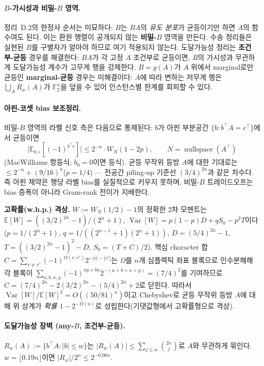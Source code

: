 \documentclass[11pt,a4paper]{article}
\theoremstyle{plain}
\theoremstyle{definition}
\newcommand{\F}{\mathbb{F}}
\newcommand{\E}{\mathbb{E}}
\begin{document}
\paragraph{$B$-가시성과 비밀-$B$ 영역.} 정리~D.2의 한정사 순서는 미묘하다: $B$는 $BA$의 \emph{유도 분포}가 균등이기만 하면 $A$의 함수여도 된다. 이는 환원 행렬이 공개되지 않는 \textbf{비밀-$B$} 영역을 만든다. 수송 정리들은 실현된 $B$를 구별자가 알아야 하므로 여기 적용되지 않는다. 도달가능성 정리는 \textbf{조건부-균등} 경우를 해결한다: $BA$가 각 고정 $A$ 조건부로 균등이면, $B$의 가시성과 무관하게 도달가능성 계수가 고무게 행을 강제한다. $B=g(A)$가 $A$ 위에서 marginal로만 균등인 \textbf{marginal-균등} 경우는 미해결이다: $A$에 따라 변하는 저무게 행은 $\bigcup_A R_w(A)$가 $\F_2^n$을 덮을 수 있어 인스턴스별 한계를 회피할 수 있다.

\paragraph{아핀-코셋 bias 보조정리.} 비밀-$B$ 영역의 라벨 신호 측은 다음으로 통제된다: $b$가 아핀 부분공간 $\{b : b^{\!\top}A = c^{\!\top}\}$에서 균등이면
\[
\bigl|\E_{b,e}[(-1)^{b^{\!\top}e}]\bigr| \le 2^{-n}\cdot W_N(1-2p), \qquad N = \operatorname{nullspace}(A^{\!\top})
\]
(MacWilliams 항등식; $b_0 = 0$이면 등식). 균등 무작위 등방 $A$에 대한 기대로는 $\le 2^{-n} + (9/16)^n$($p=1/4$) --- 전공간 piling-up 기준선 $(3/4)^{2n}$과 같은 차수다. 즉 아핀 제약은 행당 라벨 bias를 실질적으로 키우지 못하며, 비밀-$B$ 트레이드오프는 bias 증폭이 아니라 Gram-rank 전이가 지배한다.

\textbf{고확률(w.h.p.) 격상.} $W := W_N(1/2)-1$의 정확한 2차 모멘트는 $\E[W]=((3/2)^{2n}-1)/(2^n+1)$, $\operatorname{Var}[W] = p(1-p)D + qS_0 - p^2T$이다($p=1/(2^n+1)$, $q=1/((2^{n-1}+1)(2^n+1))$, $D=(5/4)^{2n}-1$, $T=((3/2)^{2n}-1)^2-D$, $S_0=(T+C)/2$). 핵심 character 합 $C=\sum_{v\neq v'}(-1)^{\Omega(v,v')}2^{-|v|-|v'|}$는 $\Omega$를 $n$개 심플렉틱 좌표 블록으로 인수분해해 각 블록이 $\sum_{a,b,x,y}(-1)^{ay+bx}2^{-(a+b+x+y)}=(7/4)^2$를 기여하므로 $C=(7/4)^{2n}-2(3/2)^{2n}-(5/4)^{2n}+2$로 닫힌다. 따라서 $\operatorname{Var}[W]/\E[W]^2 = O((50/81)^n)$이고 Chebyshev로 균등 무작위 등방 $A$에 대해 위 상계가 \emph{확률 $1-2^{-\Omega(n)}$}로 성립한다(기댓값형에서 고확률형으로 격상).

\paragraph{도달가능성 장벽 (any-$B$, 조건부-균등).} $R_w(A) := \{b^{\!\top}A : |b| \le w\}$는 $|R_w(A)| \le \sum_{j\le w}\binom{2n}{j}$로 $A$와 무관하게 묶인다. $w = \lfloor 0.19n\rfloor$이면 $|R_w|/2^n \le 2^{-0.06n}$.
\end{document}
